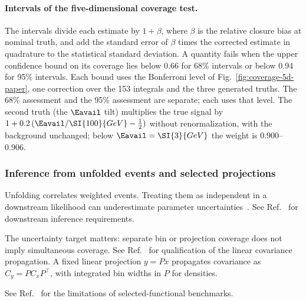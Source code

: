 \paragraph{Intervals of the five-dimensional coverage test.} The intervals divide each estimate by $1+\beta$, where $\beta$ is the relative closure bias at nominal truth, and add the standard error of $\beta$ times the corrected estimate in quadrature to the statistical standard deviation. A quantity fails when the upper confidence bound on its coverage lies below 0.66 for 68\% intervals or below 0.94 for 95\% intervals. Each bound uses the Bonferroni level of Fig.~\ref{fig:coverage-5d-paper}, one correction over the 153 integrals and the three generated truths. The 68\% assessment and the 95\% assessment are separate; each uses that level. The second truth (the $\Eavail$ tilt) multiplies the true signal by $1+0.2\,(\Eavail/\SI{100}{GeV}-\tfrac12)$ without renormalization, with the background unchanged; below $\Eavail=\SI{3}{GeV}$ the weight is 0.900--0.906.



\subsubsection{Inference from unfolded events and selected projections}
\label{sec:unbinned-inference}
Unfolding correlates weighted events. Treating them as independent in a downstream likelihood can underestimate parameter uncertainties~\cite{Desai:2025correlated}. See Ref.~\cite{NoteRecords2026} for downstream inference requirements.

The uncertainty target matters: separate bin or projection coverage does not imply simultaneous coverage. See Ref.~\cite{NoteRecords2026} for qualification of the linear covariance propagation. A fixed linear projection $y=P x$ propagates covariance as $C_y=P C_x P^{\top}$, with integrated bin widths in $P$ for densities.

See Ref.~\cite{NoteRecords2026} for the limitations of selected-functional benchmarks.

